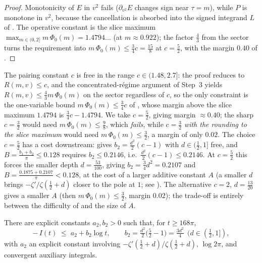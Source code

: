 \begin{proof}
Monotonicity of $E$ in $v^2$ fails ($\partial_{v^2}E$ changes sign near $\tau=m$),
while $P$ is monotone in $v^2$, because the cancellation is absorbed into the
signed integrand $L$ of . The operative constant is the
slice maximum $\max_{m\in(0,2]}m\,\Phi_0(m)=1.4794\ldots$ (at $m\approx0.922$); the
factor $\tfrac43$ from the sector turns the requirement into
$m\,\Phi_0(m)\le\tfrac34 c=\tfrac{15}8$ at $c=\tfrac52$, with the margin $0.40$ of
.
\end{proof}

\begin{remark}
The pairing constant $c$ is free in the range $c\in(1.48,2.7]$: the proof reduces
to $R(m,v)\le c$, and the concentrated-régime argument of Step~3 yields
$R(m,v)\le\tfrac43 m\,\Phi_0(m)$ on the sector regardless of $c$, so the only
constraint is the one-variable bound $m\,\Phi_0(m)\le\tfrac34 c$ of
, whose margin above the slice maximum $1.4794$ is
$\tfrac34 c-1.4794$. We take $c=\tfrac52$, giving margin $\approx0.40$; the sharp
$c=\tfrac32$ would need $m\,\Phi_0(m)\le\tfrac98$, which \emph{fails}, while
$c=\tfrac32$ \emph{with the rounding to the slice maximum} would need
$m\,\Phi_0(m)\le\tfrac32$, a margin of only $0.02$. The choice $c=\tfrac52$ has a
cost downstream:  gives $b_2=\tfrac{d^2}2(c-1)$ with
$d\in(\tfrac12,1]$ free, and $B=\tfrac{b_1+b_2}\pi\le0.128$ requires
$b_2\le0.2146$, i.e.\ $\tfrac{d^2}2(c-1)\le0.2146$. At $c=\tfrac52$ this forces the
smaller depth $d=\tfrac{53}{100}$, giving $b_2=\tfrac34 d^2=0.2107$ and
$B=\tfrac{0.1875+0.2107}{\pi}<0.128$, at the cost of a larger additive constant $A$
(a smaller $d$ brings $-\zeta'/\zeta(\tfrac12+d)$ closer to the pole at $1$; see
). The alternative $c=2$, $d=\tfrac{13}{20}$ gives a smaller $A$
(then $m\,\Phi_0(m)\le\tfrac32$, margin $0.02$); the trade-off is entirely between
the difficulty of  and the
size of $A$.
\end{remark}

\begin{lemma}
\label{lem:lb_I_lower}
\leanok
{}
There are explicit constants $a_2,b_2>0$ such that, for $t\ge168\pi$,
\[
  -\,I(t) \;\le\; a_2 + b_2\log t,
  \qquad
  b_2 = \tfrac{d^2}{2}\bigl(\tfrac52 - 1\bigr) = \tfrac{3d^2}{4}\ \ (d\in(\tfrac12,1]),
\]
with $a_2$ an explicit constant involving
$-\zeta'(\tfrac12+d)/\zeta(\tfrac12+d)$, $\log 2\pi$, and convergent auxiliary
integrals.
\end{lemma}

